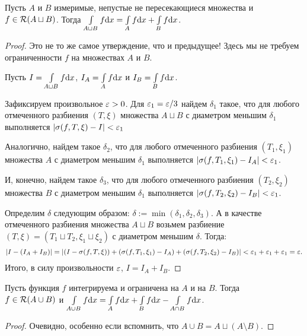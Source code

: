 \begin{Statement}
Пусть $A$ и $B$ измеримые, непустые не пересекающиеся множества и \\$f \in \mathcal{R}(A \sqcup B)$. Тогда $\int\limits_{A \sqcup B}f \mathrm{d} x = \int\limits_A f \mathrm{d} x + \int\limits_B f \mathrm{d} x$.
\end{Statement}
\begin{proof}
Это не то же самое утверждение, что и предыдущее! Здесь мы не требуем ограниченности $f$ на множествах $A$ и $B$.

Пусть $I = \int\limits_{A \sqcup B}f \mathrm{d} x$, $I_A = \int\limits_A f \mathrm{d} x$ и $I_B =\int\limits_B f \mathrm{d} x$.

Зафиксируем произвольное $\varepsilon > 0$. Для $\varepsilon_1 = \varepsilon / 3$ найдем $\delta_1$ такое, что для любого отмеченного разбиения $(T, \xi)$ множества $A \sqcup B$ с диаметром меньшим $\delta_1$ выполняется $|\sigma(f, T, \xi) - I| < \varepsilon_1$

Аналогично, найдем такое $\delta_2$, что для любого отмеченного разбиения $(T_1, \xi_1)$ множества $A$ с диаметром меньшим $\delta_1$ выполняется $|\sigma(f, T_1, \xi_1) - I_A| < \varepsilon_1$.

И, конечно, найдем такое $\delta_3$, что для любого отмеченного разбиения $(T_2, \xi_2)$ множества $B$ с диаметром меньшим $\delta_1$ выполняется $|\sigma(f, T_2, \xi_2) - I_B| < \varepsilon_1$.

Определим $\delta$ следующим образом: $\delta := \min(\delta_1, \delta_2, \delta_3)$. А в качестве отмеченного разбиения множества $A \sqcup B$ возьмем разбиение $(T, \xi) = (T_1 \sqcup T_2, \xi_1 \sqcup \xi_2)$ с диаметром меньшим $\delta$. Тогда:
\begin{gather}
|I - (I_A + I_B)| = \left| (I - \sigma(f, T, \xi)) + (\sigma(f, T_1, \xi_1) - I_A) + (\sigma(f, T_2, \xi_2) - I_B) \right| < \varepsilon_1 + \varepsilon_1 + \varepsilon_1 = \varepsilon.
\end{gather}
Итого, в силу произвольности $\varepsilon$, $I = I_A + I_B$.
\end{proof}

\begin{Statement}
Пусть функция $f$ интегрируема и ограничена на $A$ и на $B$. Тогда \\$f \in \mathcal{R}(A \cup B)$ и $\int\limits_{A \cup B} f\mathrm{d}x = \int\limits_A f \mathrm{d}x + \int\limits_B f \mathrm{d}x - \int\limits_{A \cap B} f\mathrm{d}x$.
\end{Statement}
\begin{proof}
Очевидно, особенно если вспомнить, что $A \cup B = A \sqcup (A \setminus B)$.
\end{proof}

